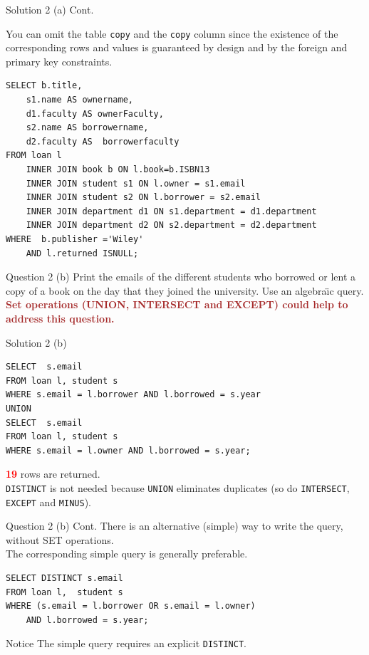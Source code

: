 \begin{frame}[fragile]{Solution 2 (a) Cont.}

You can omit the table \texttt{copy} and the \texttt{copy} column since the existence of the corresponding rows and values is guaranteed by design and by the foreign and primary key constraints.

\begin{lstlisting}
SELECT b.title, 
	s1.name AS ownername, 
	d1.faculty AS ownerFaculty, 
	s2.name AS borrowername, 
	d2.faculty AS  borrowerfaculty
FROM loan l 
	INNER JOIN book b ON l.book=b.ISBN13
	INNER JOIN student s1 ON l.owner = s1.email
	INNER JOIN student s2 ON l.borrower = s2.email
	INNER JOIN department d1 ON s1.department = d1.department
	INNER JOIN department d2 ON s2.department = d2.department
WHERE  b.publisher ='Wiley'
	AND l.returned ISNULL;
\end{lstlisting} 
\end{frame}

	
\begin{frame}[fragile]{Question 2 (b)}
Print the emails of the different students who borrowed or lent a copy of a book on the day that they joined the university. Use an algebra\"{\i}c query.\\
\vspace{10pt}
\textcolor{brown}{\textbf{Set operations (UNION, INTERSECT and EXCEPT) could help to address this question.}}
\end{frame}

\begin{frame}[fragile]{Solution 2 (b)}

\begin{lstlisting}
SELECT  s.email 
FROM loan l, student s 
WHERE s.email = l.borrower AND l.borrowed = s.year
UNION
SELECT  s.email 
FROM loan l, student s 
WHERE s.email = l.owner AND l.borrowed = s.year;
\end{lstlisting}

\textcolor{red}{\textbf{19}} rows are returned.\\
\vspace{5pt}
\texttt{DISTINCT} is not needed because \texttt{UNION}  eliminates duplicates (so do \texttt{INTERSECT}, \texttt{EXCEPT} and \texttt{MINUS}). 

\end{frame}

\begin{frame}[fragile]{Question 2 (b) Cont.}
There is an alternative (simple) way to write the query, without SET operations.\\
\vspace{10pt}
The corresponding simple query is generally preferable.

\begin{lstlisting}
SELECT DISTINCT s.email 
FROM loan l,  student s 
WHERE (s.email = l.borrower OR s.email = l.owner) 
	AND l.borrowed = s.year;
\end{lstlisting}

\begin{alertblock}{Notice}
The simple query requires an explicit \texttt{DISTINCT}.	
\end{alertblock}

\end{frame}

